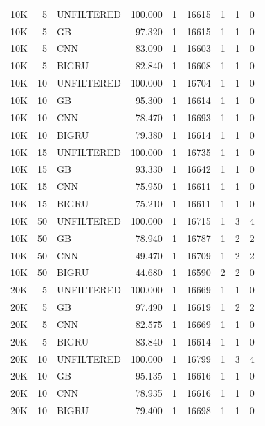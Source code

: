 \begin{landscape}
\begin{table}[htbp]
\begin{tabular}{lrlrrrrrr}
10K & 5  & UNFILTERED & 100.000 & 1 & 16615 & 1 & 1 & 0 \\
10K & 5  & GB         & 97.320  & 1 & 16615 & 1 & 1 & 0 \\
10K & 5  & CNN        & 83.090  & 1 & 16603 & 1 & 1 & 0 \\
10K & 5  & BIGRU      & 82.840  & 1 & 16608 & 1 & 1 & 0 \\

10K & 10 & UNFILTERED & 100.000 & 1 & 16704 & 1 & 1 & 0 \\
10K & 10 & GB         & 95.300  & 1 & 16614 & 1 & 1 & 0 \\
10K & 10 & CNN        & 78.470  & 1 & 16693 & 1 & 1 & 0 \\
10K & 10 & BIGRU      & 79.380  & 1 & 16614 & 1 & 1 & 0 \\

10K & 15 & UNFILTERED & 100.000 & 1 & 16735 & 1 & 1 & 0 \\
10K & 15 & GB         & 93.330  & 1 & 16642 & 1 & 1 & 0 \\
10K & 15 & CNN        & 75.950  & 1 & 16611 & 1 & 1 & 0 \\
10K & 15 & BIGRU      & 75.210  & 1 & 16611 & 1 & 1 & 0 \\

10K & 50 & UNFILTERED & 100.000 & 1 & 16715 & 1 & 3 & 4 \\
10K & 50 & GB         & 78.940  & 1 & 16787 & 1 & 2 & 2 \\
10K & 50 & CNN        & 49.470  & 1 & 16709 & 1 & 2 & 2 \\
10K & 50 & BIGRU      & 44.680  & 1 & 16590 & 2 & 2 & 0 \\

20K & 5  & UNFILTERED & 100.000 & 1 & 16669 & 1 & 1 & 0 \\
20K & 5  & GB         & 97.490  & 1 & 16619 & 1 & 2 & 2 \\
20K & 5  & CNN        & 82.575  & 1 & 16669 & 1 & 1 & 0 \\
20K & 5  & BIGRU      & 83.840  & 1 & 16614 & 1 & 1 & 0 \\

20K & 10 & UNFILTERED & 100.000 & 1 & 16799 & 1 & 3 & 4 \\
20K & 10 & GB         & 95.135  & 1 & 16616 & 1 & 1 & 0 \\
20K & 10 & CNN        & 78.935  & 1 & 16616 & 1 & 1 & 0 \\
20K & 10 & BIGRU      & 79.400  & 1 & 16698 & 1 & 1 & 0 \\


\end{tabular}
\end{table}
\end{landscape}
